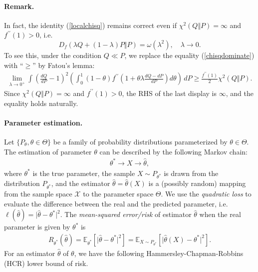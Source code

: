 \documentclass{article}
\numberwithin{equation}{section}
\newcommand{\E}{\mathbb{E}}
\renewcommand{\cal}{\mathcal}
\newcommand{\wh}{\widehat}
\theoremstyle{plain}
\theoremstyle{definition}
\begin{document}
\paragraph{Remark.} In fact, the identity (\ref{localchisq}) remains correct even if $\chi^2(Q\Vert P)=\infty$ and $f^{\prime\prime}(1)>0$, i.e. $$D_f(\lambda Q+(1-\lambda)P\Vert P)=\omega(\lambda^2),\quad\lambda\to 0.$$ To see this, under the condition $Q\ll P$, we replace the equality (\ref{chisqdominate}) with ``$\geq$'' by Fatou's lemma:
\begin{align}
\lim_{\lambda\to 0^+}\int\left(\frac{dQ}{dP}-1\right)^2\left(\int_0^1(1-\theta)f^{\prime\prime}\left(1+\theta\lambda\frac{dQ-dP}{dP}\right)d\theta\right)\,dP
\geq\frac{f^{\prime\prime}(1)}{2}\chi^2(Q\Vert P).
\end{align}
Since $\chi^2(Q\Vert P)=\infty$ and $f^{\prime\prime}(1)>0$, the RHS of the last display is $\infty$, and the equality holds naturally.

\paragraph{Parameter estimation.} Let $\{P_\theta,\theta\in\Theta\}$ be a family of probability distributions parameterized by $\theta\in\Theta$. The estimation of parameter $\theta$ can be described by the following Markov chain:
\begin{align*}
	\theta^*\to X\to\wh{\theta},
\end{align*}
where $\theta^*$ is the true parameter, the sample $X\sim P_{\theta^*}$ is drawn from the distribution $P_{\theta^*}$, and  the estimator $\wh{\theta}=\wh{\theta}(X)$ is a (possibly random) mapping from the sample space $\cal{X}$ to the parameter space $\Theta$. We use the \textit{quadratic loss} to evaluate the difference between the real and the predicted parameter, i.e. $\ell(\wh{\theta})=\vert\wh{\theta}-\theta^*\vert^2$. The \textit{mean-squared error/risk} of estimator $\wh{\theta}$ when the real parameter is given by $\theta^*$ is
\begin{align*}
	R_{\theta^*}(\wh{\theta})=\E_{\theta^*}[\vert\wh{\theta}-\theta^*\vert^2]=\E_{X\sim P_{\theta^*}}\left[\bigl\vert\wh{\theta}(X)-\theta^*\bigr\vert^2\right].
\end{align*}
For an estimator $\wh{\theta}$ of $\theta$, we have the following Hammersley-Chapman-Robbins (HCR) lower bound of risk.
\end{document}
